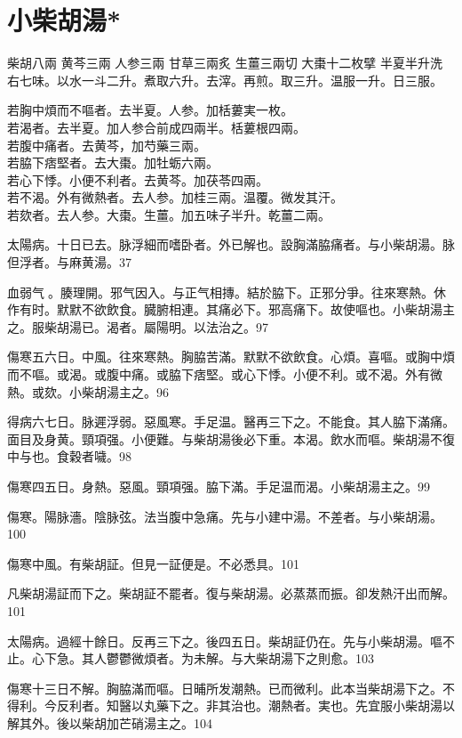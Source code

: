 \section{小柴胡湯*}

柴胡{\scriptsize 八兩} 黄芩{\scriptsize 三兩} 人参{\scriptsize 三兩} 甘草{\scriptsize 三兩炙} 生薑{\scriptsize 三兩切} 大棗{\scriptsize 十二枚擘} 半夏{\scriptsize 半升洗}\\
右七味。以水一斗二升。煮取六升。去滓。再煎。取三升。温服一升。日三服。

若胸中煩而不嘔者。去半夏。人参。加栝蔞実一枚。\\
若渴者。去半夏。加人参合前成四兩半。栝蔞根四兩。\\
若腹中痛者。去黄芩，加芍藥三兩。\\
若脇下痞堅者。去大棗。加牡蛎六兩。\\
若心下悸。小便不利者。去黄芩。加茯苓四兩。\\
若不渴。外有微熱者。去人参。加桂三兩。温覆。微发其汗。\\
若欬者。去人参。大棗。生薑。加五味子半升。乾薑二兩。

太陽病。十日已去。脉浮細而嗜卧者。外已解也。設胸滿脇痛者。与小柴胡湯。脉{\khaai 但}浮者。与麻黄湯。37

血弱气{\sungii 𥁞}。腠理開。邪气因入。与正气相摶。結於脇下。正邪分爭。往來寒熱。休作有时。默默不欲飲食。臓腑相連。其痛必下。邪高痛下。故使嘔也。小柴胡湯主之。服柴胡湯已。渴者。屬陽明。以法治之。97

傷寒五六日。中風。往來寒熱。胸脇苦滿。默默不欲飲食。心煩。喜嘔。或胸中煩而不嘔。或渴。或腹中痛。或脇下痞堅。或心下悸。小便不利。或不渴。外有微熱。或欬。小柴胡湯主之。96

得病六七日。脉遲浮弱。惡風寒。手足温。醫再三下之。不能食。其人脇下滿{\khaai 痛}。面目及身黄。頸項强。小便難。与柴胡湯後必下重。本渴。飲水而嘔。柴胡{\khaai 湯}不復中与也。食穀者噦。98

傷寒四五日。身熱。惡風。頸項强。脇下滿。手足温而渴。小柴胡湯主之。99

傷寒。陽脉濇。陰脉弦。法当腹中急痛。先与小建中湯。不差者。与小柴胡湯。100

傷寒中風。有柴胡証。但見一証便是。不必悉具。101

凡柴胡湯証而下之。柴胡証不罷者。復与柴胡湯。必蒸蒸而振。卻发熱汗出而解。101

太陽病。過經十餘日。反再三下之。後四五日。柴胡証仍在。先与小柴胡湯。嘔不止。心下急。其人鬱鬱微煩者。为未解。与大柴胡湯下之則愈。103

傷寒十三日不解。胸脇滿而嘔。日晡所发潮熱{\khaai 。已}而微利。此本当柴胡湯下之。不得利。今反利者。知醫以丸藥下之。非其治也。潮熱者。実也。先宜服小柴胡湯以解其外。後以柴胡加芒硝湯主之。104

